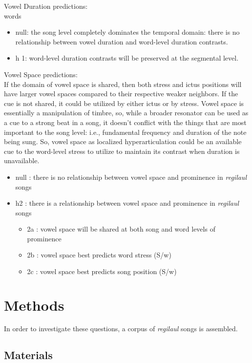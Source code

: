 \documentclass[12pt]{article}
\begin{document}
Vowel Duration predictions: \\
words
\begin{itemize}
	\item null: the song level completely dominates the temporal domain:  there is no relationship 			between vowel duration and word-level duration contrasts. 	
	\item h 1: word-level duration contrasts will be preserved at the segmental level.
\end{itemize}
Vowel Space predictions: \\
If the domain of vowel space is shared, then both stress and ictus positions will have larger vowel spaces compared to their respective weaker neighbors. If the cue is not shared, it could be utilized by either ictus or by stress. Vowel space is essentially a manipulation of timbre, so, while a broader resonator can be used as a cue to a strong beat in a song, it doesn't conflict with the things that are most important to the song level: i.e., fundamental frequency and duration of the note being sung. So, vowel space as localized hyperarticulation could be an available cue to the word-level stress to utilize to maintain its contrast when duration is unavailable. \\
\begin{itemize}
	\item null : there is no relationship between vowel space and prominence in {\it regilaul} songs
	\item h2 : there is a relationship between vowel space and prominence in {\it regilaul} songs
		\begin{itemize}
		\item 2a : 	vowel space will be shared at both song and word levels of prominence
		\item 2b : vowel space best predicts word stress (S/w)
		\item 2c : vowel space best predicts song position (S/w)
		\end{itemize}
\end{itemize}
\section*{Methods}
In order to investigate these questions, a corpus of {\it regilaul} songs is assembled. 


\subsection*{Materials}
\end{document}
